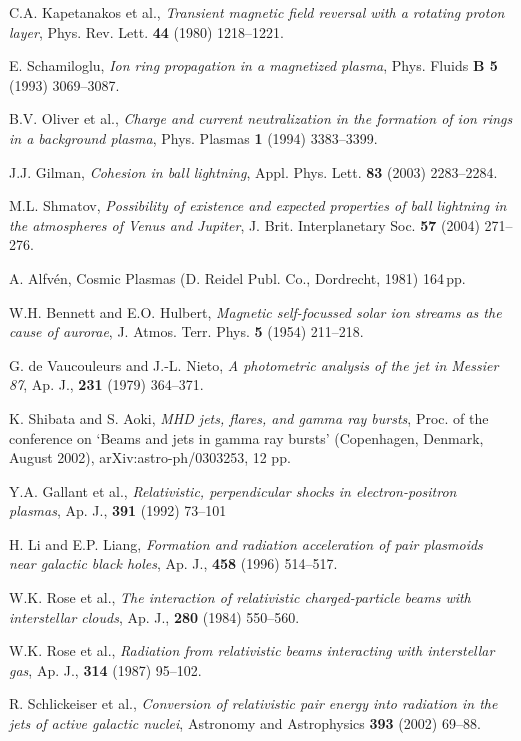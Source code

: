 \documentclass [12pt,a4paper,     ]{report} %
\begin{document}
\begin{enumerate}
 C.A. Kapetanakos et al., \emph{Transient magnetic field reversal with a rotating proton layer}, Phys. Rev. Lett. {\bf 44} (1980) 1218--1221.

 E. Schamiloglu, \emph{Ion ring propagation in a magnetized plasma}, Phys. Fluids {\bf B 5} (1993) 3069--3087.

 B.V. Oliver et al., \emph{Charge and current neutralization in the formation of ion rings in a background plasma}, Phys. Plasmas {\bf 1} (1994) 3383--3399.

 J.J. Gilman, \emph{Cohesion in ball lightning}, Appl. Phys. Lett. {\bf 83} (2003) 2283--2284.

 M.L. Shmatov, \emph{Possibility of existence and expected properties of ball lightning in the atmospheres of Venus and Jupiter}, J. Brit. Interplanetary Soc. {\bf 57} (2004) 271--276.

 A. Alfv\'en, Cosmic Plasmas (D. Reidel Publ. Co., Dordrecht, 1981) 164\,pp.

 W.H. Bennett and E.O. Hulbert, \emph{Magnetic self-focussed solar ion streams as the cause of aurorae}, J. Atmos. Terr. Phys. {\bf 5} (1954) 211--218.

 G. de Vaucouleurs and J.-L. Nieto, \emph{A photometric analysis of the jet in Messier 87}, Ap. J., {\bf 231} (1979) 364--371.

 K. Shibata and S. Aoki, \emph{MHD jets, flares, and gamma ray bursts}, Proc. of the conference on `Beams and jets in gamma ray bursts' (Copenhagen, Denmark, August 2002), arXiv:astro-ph/0303253, 12 pp.

 Y.A. Gallant et al., \emph{Relativistic, perpendicular shocks in electron-positron plasmas}, Ap. J., {\bf 391} (1992) 73--101

 H. Li and E.P. Liang, \emph{Formation and radiation acceleration of pair plasmoids near galactic black holes}, Ap. J., {\bf 458} (1996) 514--517.

 W.K. Rose et al., \emph{The interaction of relativistic charged-particle beams with interstellar clouds},  Ap. J., {\bf 280} (1984) 550--560.

 W.K. Rose et al., \emph{Radiation from relativistic beams interacting with interstellar gas},  Ap. J., {\bf 314} (1987) 95--102.

 R. Schlickeiser et al., \emph{Conversion of relativistic pair energy into radiation in the jets of active galactic nuclei}, Astronomy and Astrophysics {\bf 393} (2002) 69--88.


\end{enumerate}
\end{document}

